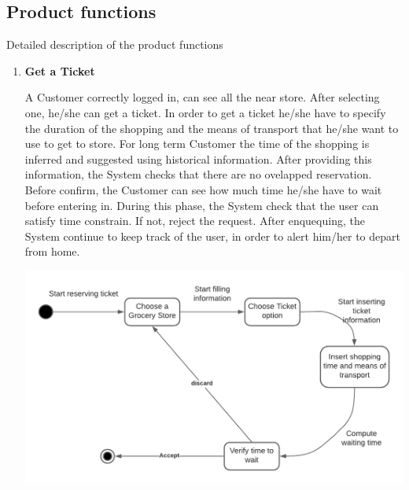 \documentclass[a4paper, 10pt, oneside]{article}
\begin{document}
\subsection{Product functions}
Detailed description of the product functions

\begin{enumerate}
    \item \textbf{Get a Ticket}
    \begin{flushleft}
        A Customer correctly logged in, can see all the near store. After selecting one, he/she can get a ticket. In order to get a ticket he/she have to specify the duration of the shopping and the means of transport that he/she want to use to get to store. For long term Customer the time of the shopping is inferred and suggested using historical information.
        After providing this information, the System checks that there are no ovelapped reservation.
        Before confirm, the Customer can see how much time he/she have to wait before entering in. During this phase, the System check that the user can satisfy time constrain. If not, reject the request.
        After enquequing, the System continue to keep track of the user, in order to alert him/her to depart from home.
    \end{flushleft} 
       	\begin{minipage}{\linewidth}
            \centering
           \includegraphics[height=0.3\textheight, scale=0.2, keepaspectratio]{img/Get_Ticket_diagram.png}
        \end{minipage}
    

\end{enumerate}
\end{document}
